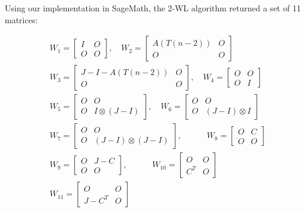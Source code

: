 Using our implementation in SageMath, the 2-WL algorithm returned a set of 11 matrices:

\begin{align*}
    &W_1 = \begin{bmatrix}
        I & O\\
        O & O
    \end{bmatrix}, \quad
    W_2 = \begin{bmatrix}
        A(T(n-2)) & O\\
        O & O
    \end{bmatrix}\\
    &W_3 = \begin{bmatrix}
        J-I-A(T(n-2)) & O\\
        O & O
    \end{bmatrix}, \quad
    W_4 = \begin{bmatrix}
        O & O\\
        O & I
    \end{bmatrix}\\
    &W_5 = \begin{bmatrix}
        O & O\\
        O & I\otimes (J-I)
    \end{bmatrix}, \quad
    W_6 = \begin{bmatrix}
        O & O\\
        O & (J-I)\otimes I
    \end{bmatrix}\\
    &W_7 = \begin{bmatrix}
        O & O\\
        O & (J-I)\otimes (J-I)
    \end{bmatrix}, \quad\quad\quad
    W_8 = \begin{bmatrix}
        O & C\\
        O & O
    \end{bmatrix}\\
    &W_9 = \begin{bmatrix}
        O & J-C\\
        O & O
    \end{bmatrix}, \quad\quad\quad
    W_{10} = \begin{bmatrix}
        O & O\\
        C^T & O
    \end{bmatrix}\\
    &W_{11} = \begin{bmatrix}
        O & O\\
        J-C^T & O
    \end{bmatrix}
\end{align*}

